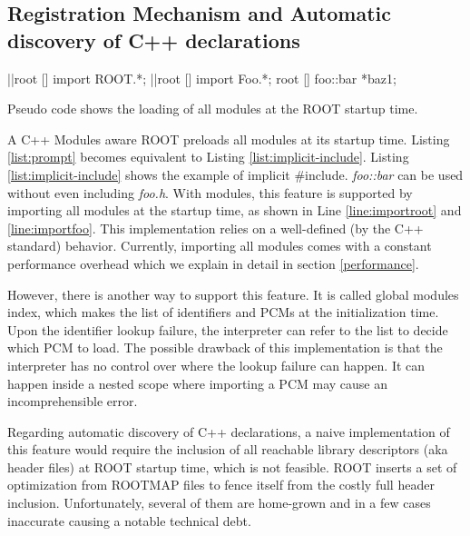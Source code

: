 \documentclass{webofc}
\begin{document}
\subsection{Registration Mechanism and Automatic discovery of C++ declarations}
\label{subsec:preloading}

\begin{listing}[h]
    \noindent
    \begin{minipage}[h]{.7\textwidth}
    \begin{cppcode*}{}
    |\label{line:importroot}|root [] import ROOT.*;
    |\label{line:importfoo}|root [] import Foo.*;
    root [] foo::bar *baz1;
    \end{cppcode*}
    \end{minipage}
    \caption{Pseudo code shows the loading of all modules at the ROOT startup time.}
    \label{list:implicit-include}
\end{listing}

A C++ Modules aware ROOT preloads all modules at its startup time. Listing \ref{list:prompt} becomes equivalent to Listing \ref{list:implicit-include}. Listing \ref{list:implicit-include} shows the example of implicit \#include. {\it foo::bar} can be used without even including {\it foo.h}. With modules, this feature is supported by importing all modules at the startup time, as shown in Line \ref{line:importroot} and \ref{line:importfoo}. This implementation relies on a well-defined (by the C++ standard) behavior. Currently, importing all modules comes with a constant performance overhead which we explain in detail in section \ref{performance}.

However, there is another way to support this feature. It is called global modules index, which makes the list of identifiers and PCMs at the initialization time. Upon the identifier lookup failure, the interpreter can refer to the list to decide which PCM to load. The possible drawback of this implementation is that the interpreter has no control over where the lookup failure can happen. It can happen inside a nested scope where importing a PCM may cause an incomprehensible error.

Regarding automatic discovery of C++ declarations, a naive implementation of this feature would require the inclusion of all reachable library descriptors (aka header files) at ROOT startup time, which is not feasible. ROOT inserts a set of optimization from ROOTMAP files to fence itself from the costly full header inclusion. Unfortunately, several of them are home-grown and in a few cases inaccurate causing a notable technical debt.
\end{document}
